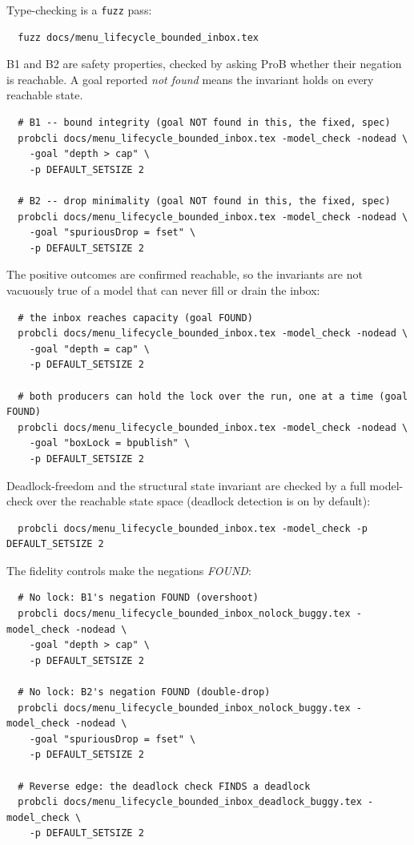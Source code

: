 \documentclass[a4paper,10pt,fleqn]{article}
\begin{document}
Type-checking is a \texttt{fuzz} pass:
\begin{verbatim}
  fuzz docs/menu_lifecycle_bounded_inbox.tex
\end{verbatim}

B1 and B2 are safety properties, checked by asking ProB whether their negation
is reachable. A goal reported \emph{not found} means the invariant holds on every
reachable state.

\begin{verbatim}
  # B1 -- bound integrity (goal NOT found in this, the fixed, spec)
  probcli docs/menu_lifecycle_bounded_inbox.tex -model_check -nodead \
    -goal "depth > cap" \
    -p DEFAULT_SETSIZE 2

  # B2 -- drop minimality (goal NOT found in this, the fixed, spec)
  probcli docs/menu_lifecycle_bounded_inbox.tex -model_check -nodead \
    -goal "spuriousDrop = fset" \
    -p DEFAULT_SETSIZE 2
\end{verbatim}

The positive outcomes are confirmed reachable, so the invariants are not
vacuously true of a model that can never fill or drain the inbox:

\begin{verbatim}
  # the inbox reaches capacity (goal FOUND)
  probcli docs/menu_lifecycle_bounded_inbox.tex -model_check -nodead \
    -goal "depth = cap" \
    -p DEFAULT_SETSIZE 2

  # both producers can hold the lock over the run, one at a time (goal FOUND)
  probcli docs/menu_lifecycle_bounded_inbox.tex -model_check -nodead \
    -goal "boxLock = bpublish" \
    -p DEFAULT_SETSIZE 2
\end{verbatim}

Deadlock-freedom and the structural state invariant are checked by a full
model-check over the reachable state space (deadlock detection is on by default):

\begin{verbatim}
  probcli docs/menu_lifecycle_bounded_inbox.tex -model_check -p DEFAULT_SETSIZE 2
\end{verbatim}

The fidelity controls make the negations \emph{FOUND}:

\begin{verbatim}
  # No lock: B1's negation FOUND (overshoot)
  probcli docs/menu_lifecycle_bounded_inbox_nolock_buggy.tex -model_check -nodead \
    -goal "depth > cap" \
    -p DEFAULT_SETSIZE 2

  # No lock: B2's negation FOUND (double-drop)
  probcli docs/menu_lifecycle_bounded_inbox_nolock_buggy.tex -model_check -nodead \
    -goal "spuriousDrop = fset" \
    -p DEFAULT_SETSIZE 2

  # Reverse edge: the deadlock check FINDS a deadlock
  probcli docs/menu_lifecycle_bounded_inbox_deadlock_buggy.tex -model_check \
    -p DEFAULT_SETSIZE 2
\end{verbatim}
\end{document}
